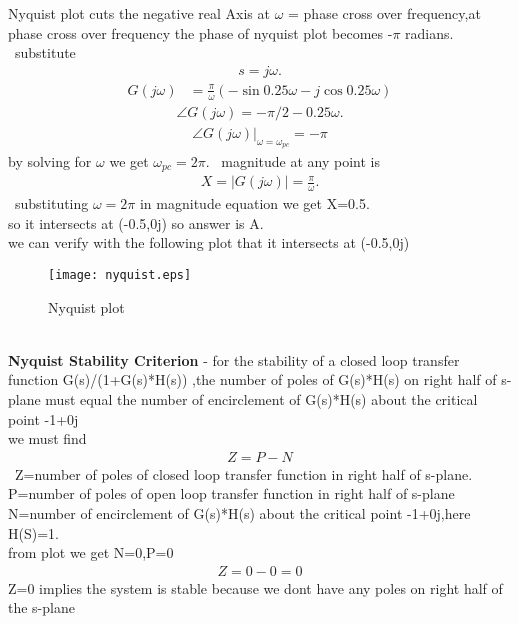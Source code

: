 \begin{enumerate}[label=\thesection.\arabic*.,ref=\thesection.\theenumi]
 Nyquist plot cuts the negative real
Axis at $\omega$ = phase cross over frequency,at phase cross over frequency the phase of nyquist plot becomes -$\pi$ radians.
\
\newline substitute \begin{align}
s=j\omega.\end{align} 
\begin{align}
G(j\omega)&=\frac{\pi}{\omega}(-\sin{0.25\omega}-j\cos{0.25\omega})
\end{align}
\begin{align}
\angle G(j\omega)=-\pi/2 -0.25\omega.
\end{align}
\begin{align}
\angle G(j\omega)|_{\omega=\omega_{pc}}=-\pi
\end{align}
by solving for $\omega$ we get $\omega_{pc}=2\pi$.
\
\newline magnitude at any point is\begin{align}
X=|G(j\omega)|=\frac{\pi}{\omega}.    
\end{align} 
\
\newline substituting $\omega=2\pi$ in magnitude equation we get X=0.5.
\\
\newline so it intersects at (-0.5,0j) so answer is A.
\\
\newline we can verify with the following plot that it intersects at (-0.5,0j)
\begin{figure}
  \texttt{[image: nyquist.eps]}
  \caption{Nyquist plot}
  \label{fig:Nyquist plot}
\end{figure}
\\
\newline \textbf{Nyquist Stability Criterion} - for  the stability of a closed loop transfer function G(s)/(1+G(s)*H(s)) ,the number of poles of G(s)*H(s) on right half of s-plane must equal the number of encirclement of G(s)*H(s) about the critical point -1+0j
\\
\newline we must find
\begin{align}
Z=P-N    
\end{align}
\
Z=number of poles of closed loop transfer function in right half of s-plane.
\\ 
\newline P=number of poles of open loop transfer function in right half of s-plane
\\ 
\newline N=number of encirclement of G(s)*H(s) about the critical point -1+0j,here H(S)=1.
\\ 
\newline from plot we get N=0,P=0
\begin{align}
Z=0-0=0
\end{align}
Z=0 implies the system is stable because we dont have any poles on right half of the s-plane



\end{enumerate}

